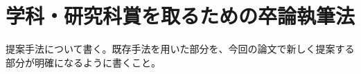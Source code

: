 \chapter{学科・研究科賞を取るための卒論執筆法}
\label{chap:method}

提案手法について書く。既存手法を用いた部分を、今回の論文で新しく提案する部分が明確になるように書くこと。
